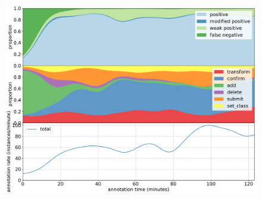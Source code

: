 \begin{figure}[!h]
\centering
\includegraphics[width=1.0\linewidth]{charts/action_annotations/scott_base.pdf}
\caption{  }
\label{fig:scott_base_annotation}
\end{figure}